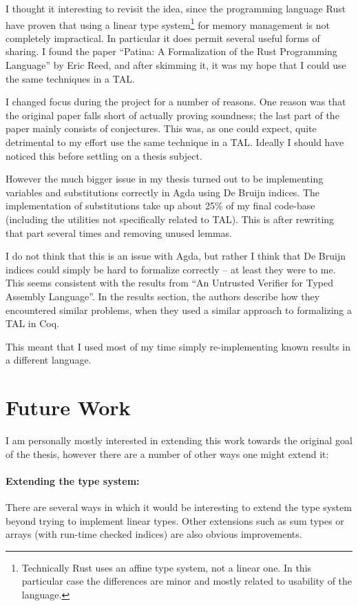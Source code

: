 I thought it interesting to revisit the idea, since the programming language
Rust\cite{rust} have proven that using a linear type system\footnote{Technically
  Rust uses an affine type system, not a linear one. In this particular case the
  differences are minor and mostly related to usability of the language.} for
memory management is not completely impractical. In particular it does permit
several useful forms of sharing. I found the paper ``Patina: A Formalization of
the Rust Programming Language''\cite{patina} by Eric Reed, and after skimming
it, it was my hope that I could use the same techniques in a TAL.

I changed focus during the project for a number of reasons. One reason was that
the original paper falls short of actually proving soundness; the last part of
the paper mainly consists of conjectures. This was, as one could expect, quite
detrimental to my effort use the same technique in a TAL. Ideally I should have
noticed this before settling on a thesis subject.

However the much bigger issue in my thesis turned out to be implementing
variables and substitutions correctly in Agda using De Bruijn indices. The
implementation of substitutions take up about 25\% of my final code-base
(including the utilities not specifically related to TAL). This is after
rewriting that part several times and removing unused lemmas.

I do not think that this is an issue with Agda, but rather I think that De
Bruijn indices could simply be hard to formalize correctly -- at least they were
to me. This seems consistent with the results from ``An Untrusted Verifier for
Typed Assembly Language''\cite{untrusted}. In the results section, the authors
describe how they encountered similar problems, when they used a similar
approach to formalizing a TAL in Coq.

This meant that I used most of my time simply re-implementing known results in a
different language.

\section{Future Work}

I am personally mostly interested in extending this work towards the original
goal of the thesis, however there are a number of other ways one might extend
it:

\paragraph{Extending the type system:}
There are several ways in which it would be interesting to extend the type
system beyond trying to implement linear types. Other extensions such as sum
types or arrays (with run-time checked indices) are also obvious improvements.

